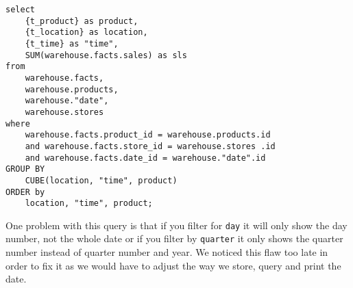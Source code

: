 \documentclass[a4paper,english,abstract=on]{scrartcl}
\begin{document}
\begin{lstlisting}
select 
	{t_product} as product,
	{t_location} as location,
	{t_time} as "time",
	SUM(warehouse.facts.sales) as sls 
from 
	warehouse.facts, 
	warehouse.products, 
	warehouse."date", 
	warehouse.stores 
where 
	warehouse.facts.product_id = warehouse.products.id 
	and warehouse.facts.store_id = warehouse.stores .id 
	and warehouse.facts.date_id = warehouse."date".id 
GROUP BY
	CUBE(location, "time", product)
ORDER by
	location, "time", product;
\end{lstlisting}


One problem with this query is that if you filter for \texttt{day} it will only show the day number, not the whole date or if you filter by \texttt{quarter} it only shows the quarter number instead of quarter number and year. We noticed this flaw too late in order to fix it as we would have to adjust the way we store, query and print the date.
\end{document}

